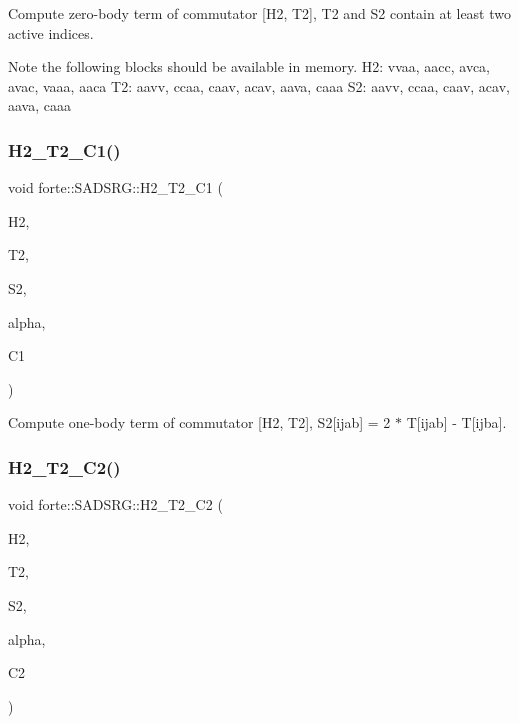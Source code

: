 Compute zero-\/body term of commutator \mbox{[}H2, T2\mbox{]}, T2 and S2 contain at least two active indices. 

Note the following blocks should be available in memory. H2\+: vvaa, aacc, avca, avac, vaaa, aaca T2\+: aavv, ccaa, caav, acav, aava, caaa S2\+: aavv, ccaa, caav, acav, aava, caaa\mbox{\label{classforte_1_1_s_a_d_s_r_g_a6c174fe0ba11650100dffa409d74386a}} 
\subsubsection{\texorpdfstring{H2\+\_\+\+T2\+\_\+\+C1()}{H2\_T2\_C1()}}
{\footnotesize\ttfamily void forte\+::\+S\+A\+D\+S\+R\+G\+::\+H2\+\_\+\+T2\+\_\+\+C1 (\begin{DoxyParamCaption}\item[{Blocked\+Tensor \&}]{H2,  }\item[{Blocked\+Tensor \&}]{T2,  }\item[{Blocked\+Tensor \&}]{S2,  }\item[{const double \&}]{alpha,  }\item[{Blocked\+Tensor \&}]{C1 }\end{DoxyParamCaption})\hspace{0.3cm}{\ttfamily [protected]}}



Compute one-\/body term of commutator \mbox{[}H2, T2\mbox{]}, S2\mbox{[}ijab\mbox{]} = 2 $\ast$ T\mbox{[}ijab\mbox{]} -\/ T\mbox{[}ijba\mbox{]}. 

\mbox{\label{classforte_1_1_s_a_d_s_r_g_adaa24b0e25e20d7e0704e21a449c3435}} 
\subsubsection{\texorpdfstring{H2\+\_\+\+T2\+\_\+\+C2()}{H2\_T2\_C2()}}
{\footnotesize\ttfamily void forte\+::\+S\+A\+D\+S\+R\+G\+::\+H2\+\_\+\+T2\+\_\+\+C2 (\begin{DoxyParamCaption}\item[{Blocked\+Tensor \&}]{H2,  }\item[{Blocked\+Tensor \&}]{T2,  }\item[{Blocked\+Tensor \&}]{S2,  }\item[{const double \&}]{alpha,  }\item[{Blocked\+Tensor \&}]{C2 }\end{DoxyParamCaption})\hspace{0.3cm}{\ttfamily [protected]}}



